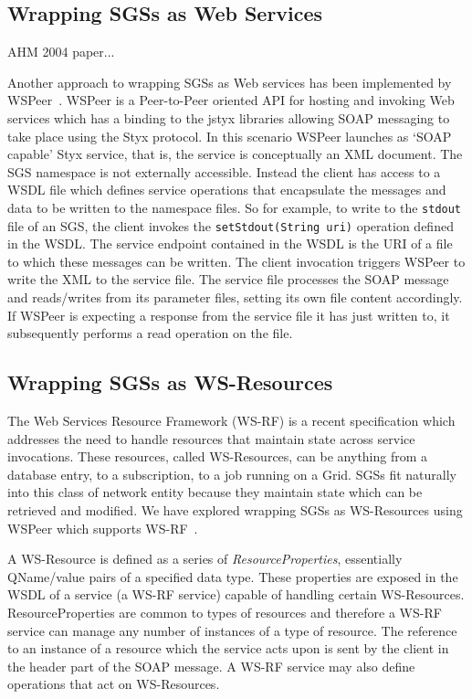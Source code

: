 \documentclass{llncs}
\begin{document}
\subsection{Wrapping SGSs as Web Services}
AHM 2004 paper...

Another approach to wrapping SGSs as Web services has been implemented by WSPeer~\cite{wspeer}. WSPeer is a Peer-to-Peer oriented API for hosting and invoking Web services which has a binding to the jstyx libraries allowing SOAP messaging to take place using the Styx protocol. In this scenario WSPeer launches as `SOAP capable' Styx service, that is, the service is conceptually an XML document. The SGS namespace is not externally accessible. Instead the client has access to a WSDL file which defines service operations that encapsulate the messages and data to be written to the namespace files. So for example, to write to the \texttt{stdout} file of an SGS, the client invokes the \texttt{setStdout(String uri)} operation defined in the WSDL. The service endpoint contained in the WSDL is the URI of a file to which these messages can be written. The client invocation triggers WSPeer to write the XML to the service file. The service file processes the SOAP message and reads/writes from its parameter files, setting its own file content accordingly. If WSPeer is expecting a response from the service file it has just written to, it subsequently performs a read operation on the file.

\subsection{Wrapping SGSs as WS-Resources}
\label{subsec:ws-resources}

The Web Services Resource Framework (WS-RF) is a recent specification which addresses the need to handle resources that maintain state across service invocations. These resources, called WS-Resources, can be anything from a database entry, to a subscription, to a job running on a Grid. SGSs fit naturally into this class of network entity because they maintain state which can be retrieved and modified. We have explored wrapping SGSs as WS-Resources using WSPeer which supports WS-RF~\cite{wsrf}.

\sloppypar A WS-Resource is defined as a series of \emph{ResourceProperties}, essentially QName/value pairs of a specified data type. These properties are exposed in the WSDL of a service (a WS-RF service) capable of handling certain WS-Resources. ResourceProperties are common to types of resources and therefore a WS-RF service can manage any number of instances of a type of resource. The reference to an instance of a resource which the service acts upon is sent by the client in the header part of the SOAP message. A WS-RF service may also define operations that act on WS-Resources.
\end{document}
